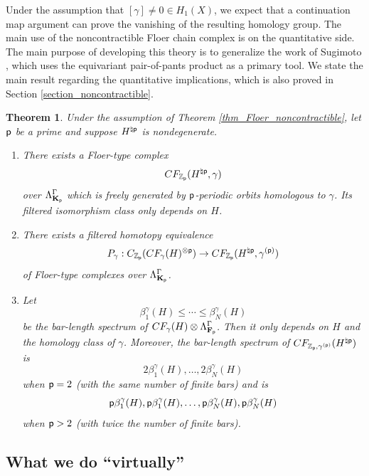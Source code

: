 \documentclass[reqno, 10pt]{amsart}
\numberwithin{equation}{section}
\numberwithin{equation}{section}
\newtheorem{thm}{Theorem}[section]
\theoremstyle{definition}
\theoremstyle{remark}
\newcommand{\beqn}{\begin{equation*}}
\newcommand{\eeqn}{\end{equation*}}
\newcommand{\mb}{\mathbb}
\newcommand{\p}{{\sf p}}
\newcommand{\fp}{{\bf F}_{\sf p}}
\newcommand{\kp}{{\bf K}_{\sf p}}
\newcommand{\zp}{{{\mb Z}_{\sf p}}}
\begin{document}
Under the assumption that $[\gamma] \neq 0 \in H_1(X)$, we expect that a continuation map argument can prove the vanishing of the resulting homology group. The main use of the noncontractible Floer chain complex is on the quantitative side. The main purpose of developing this theory is to generalize the work of Sugimoto \cite{Sugimoto_2026}, which uses the equivariant pair-of-pants product as a primary tool. We state the main result regarding the quantitative implications, which is also proved in Section \ref{section_noncontractible}.

\begin{thm}\label{thm_noncontractible_pants}
Under the assumption of Theorem \ref{thm_Floer_noncontractible}, let $\p$ be a prime and suppose $H^{\natural \p}$ is nondegenerate. 
\begin{enumerate}
\item There exists a Floer-type complex
\beqn
CF_{\zp}(H^{\natural \p}, \gamma)
\eeqn
over $\Lambda_{\kp}^\Gamma$ which is freely generated by $\p$-periodic orbits homologous to $\gamma$. Its filtered isomorphism class only depends on $H$.

\item There exists a filtered homotopy equivalence
\beqn
P_\gamma: C_{\zp}(CF_\gamma(H)^{\otimes \p}) \to CF_{\zp}(H^{\natural \p}, \gamma^{(\p)})
\eeqn
of Floer-type complexes over $\Lambda_{\kp}^\Gamma$.

\item Let 
\beqn
\beta_1^\gamma (H) \leq \cdots \leq \beta_N^\gamma (H)
\eeqn
be the bar-length spectrum of $CF_\gamma(H) \otimes \Lambda_{\fp}^\Gamma$. Then it only depends on $H$ and the homology class of $\gamma$. Moreover, the bar-length spectrum of $CF_{\zp, \gamma^{(\p)}} (H^{\natural \p})$ is 
\beqn
2\beta_1^\gamma(H), \ldots, 2 \beta_N^{\gamma}(H)
\eeqn
when $\p = 2$ (with the same number of finite bars) and is 
\beqn
\p \beta_1^\gamma(H), \p \beta_1^\gamma(H), \ldots, \p \beta_N^\gamma(H), \p \beta_N^\gamma(H)
\eeqn
when $\p>2$ (with twice the number of finite bars).
\end{enumerate}
\end{thm}
 








\subsection{What we do ``virtually''}
\end{document}
